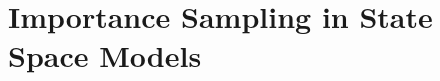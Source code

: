 \glsresetall
\newcommand{\acem}{\acrshort{cem}\xspace}
\newcommand{\ce}{{\ensuremath{\text{CE}}}}
\newcommand{\pce}{{\ensuremath{\psi_{\text{CE}}}}}
\newcommand{\hpce}{{\ensuremath{\hat\psi_{\text{CE}}}}}

\newcommand{\aeis}{\acrshort{eis}\xspace}
\newcommand{\eis}{{\ensuremath{\text{EIS}}}}
\newcommand{\peis}{{\ensuremath{\psi_{\text{EIS}}}}}
\newcommand{\hpeis}{{\ensuremath{\hat\psi_{\text{EIS}}}}}

\newcommand{\la}{{\ensuremath{\text{LA}}}}

\newcommand{\Dto}{\stackrel{\mathcal D}{\to}}
\newcommand{\id}{\operatorname{id}}


\newcommand{\nbinom}{\operatorname{NegBinom}}
\newcommand{\bdiag}{\operatorname{block-diag}}

\chapter{Importance Sampling in State Space Models}
\label{cha:state_space_models}
